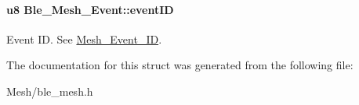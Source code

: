\paragraph[{\texorpdfstring{event\+ID}{eventID}}]{\setlength{\rightskip}{0pt plus 5cm}u8 Ble\+\_\+\+Mesh\+\_\+\+Event\+::event\+ID}\hypertarget{struct_ble___mesh___event_aab4f7eb601ab71853bd41988f913c481}{}\label{struct_ble___mesh___event_aab4f7eb601ab71853bd41988f913c481}
Event ID. See \hyperlink{group___m_e_s_h_gaa213f0dfb25460197ad32e6ab1921f66}{Mesh\+\_\+\+Event\+\_\+\+ID}. 

The documentation for this struct was generated from the following file\+:\begin{DoxyCompactItemize}
\item 
Mesh/ble\+\_\+mesh.\+h\end{DoxyCompactItemize}
